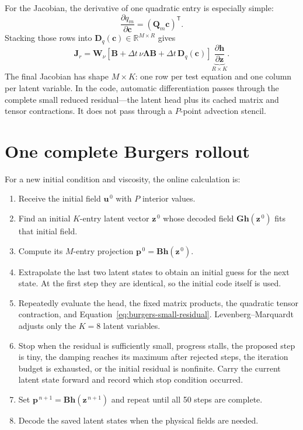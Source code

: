 \documentclass[11pt]{article}
\newcommand{\mat}[1]{\mathbf{#1}}
\newcommand{\vect}[1]{\mathbf{#1}}
\begin{document}
For the Jacobian, the derivative of one quadratic entry is especially simple:
\begin{equation}
  \frac{\partial q_m}{\partial\vect{c}}
  =(\mat{Q}_m\vect{c})^{\mathsf T}.
\end{equation}
Stacking those rows into $\mat{D}_q(\vect{c})\in\mathbb{R}^{M\times R}$ gives
\begin{equation}
  \mat{J}_r
  =\mat{W}_{\nu}
   \left[
     \mat{B}+\Delta t\,\nu\mat{\Lambda}\mat{B}
     +\Delta t\,\mat{D}_q(\vect{c})
   \right]
   \underbrace{\frac{\partial\vect{h}}{\partial\vect{z}}}_{R\times K}.
\end{equation}
The final Jacobian has shape $M\times K$: one row per test equation and one
column per latent variable.  In the code, automatic differentiation passes
through the complete small reduced residual---the latent head plus its cached
matrix and tensor contractions.  It does not pass through a $P$-point
advection stencil.

\section{One complete Burgers rollout}

For a new initial condition and viscosity, the online calculation is:
\begin{enumerate}
  \item Receive the initial field $\vect{u}^{\,0}$ with $P$ interior values.
  \item Find an initial $K$-entry latent vector $\vect{z}^{\,0}$ whose decoded
        field $\mat{G}\vect{h}(\vect{z}^{\,0})$ fits that initial field.
  \item Compute its $M$-entry projection
        $\vect{p}^{\,0}=\mat{B}\vect{h}(\vect{z}^{\,0})$.
  \item Extrapolate the last two latent states to obtain an initial guess for
        the next state.  At the first step they are identical, so the initial
        code itself is used.
  \item Repeatedly evaluate the head, the fixed matrix products, the quadratic
        tensor contraction, and Equation~\eqref{eq:burgers-small-residual}.
        Levenberg--Marquardt adjusts only the $K=8$ latent variables.
  \item Stop when the residual is sufficiently small, progress stalls, the
        proposed step is tiny, the damping reaches its maximum after rejected
        steps, the iteration budget is exhausted, or the initial residual is
        nonfinite.  Carry the current latent state forward and record which
        stop condition occurred.
  \item Set
        $\vect{p}^{\,n+1}=\mat{B}\vect{h}(\vect{z}^{\,n+1})$ and repeat until
        all 50 steps are complete.
  \item Decode the saved latent states when the physical fields are needed.
\end{enumerate}
\end{document}
